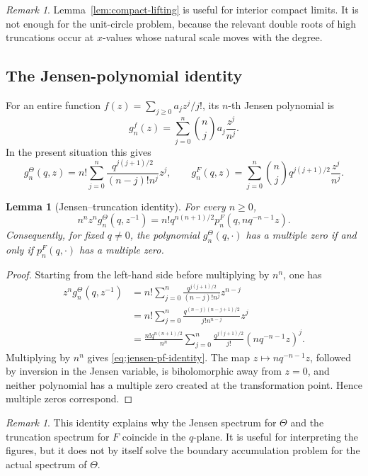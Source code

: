 \documentclass[11pt,a4paper,reqno]{amsart}
\newtheorem{lemma}[theorem]{Lemma}
\theoremstyle{remark}
\newtheorem{remark}[theorem]{Remark}
\begin{document}
\begin{remark}
Lemma~\ref{lem:compact-lifting} is useful for interior compact limits.  It is not enough for the unit-circle problem, because the relevant double roots of high truncations occur at \(x\)-values whose natural scale moves with the degree.
\end{remark}

\subsection{The Jensen-polynomial identity}
For an entire function \(f(z)=\sum_{j\ge0}a_jz^j/j!\), its \(n\)-th Jensen polynomial is
\[
        g^f_n(z)=\sum_{j=0}^n\binom nj a_j\frac{z^j}{n^j}.
\]
In the present situation this gives
\[
        g^\Theta_n(q,z)=n!\sum_{j=0}^n\frac{q^{j(j+1)/2}}{(n-j)!n^j}z^j,
        \qquad
        g^F_n(q,z)=\sum_{j=0}^n\binom nj q^{j(j+1)/2}\frac{z^j}{n^j}.
\]

\begin{lemma}[Jensen--truncation identity]\label{lem:jensen-identity}
For every \(n\ge0\),
\begin{equation}\label{eq:jensen-pf-identity}
        n^n z^n g^\Theta_n(q,z^{-1})
        =n!q^{n(n+1)/2}p^F_n(q,nq^{-n-1}z).
\end{equation}
Consequently, for fixed \(q\ne0\), the polynomial \(g^\Theta_n(q,\cdot)\) has a multiple zero if and only if \(p^F_n(q,\cdot)\) has a multiple zero.
\end{lemma}

\begin{proof}
Starting from the left-hand side before multiplying by \(n^n\), one has
\begin{align*}
 z^n g^\Theta_n(q,z^{-1})
 &=n!\sum_{j=0}^n\frac{q^{j(j+1)/2}}{(n-j)!n^j}z^{n-j}  \\
 &=n!\sum_{j=0}^n\frac{q^{(n-j)(n-j+1)/2}}{j!n^{n-j}}z^j  \\
 &=\frac{n!q^{n(n+1)/2}}{n^n}
     \sum_{j=0}^n\frac{q^{j(j+1)/2}}{j!}(nq^{-n-1}z)^j.
\end{align*}
Multiplying by \(n^n\) gives \eqref{eq:jensen-pf-identity}.  The map \(z\mapsto nq^{-n-1}z\), followed by inversion in the Jensen variable, is biholomorphic away from \(z=0\), and neither polynomial has a multiple zero created at the transformation point.  Hence multiple zeros correspond.
\end{proof}

\begin{remark}
This identity explains why the Jensen spectrum for \(\Theta\) and the truncation spectrum for \(F\) coincide in the \(q\)-plane.  It is useful for interpreting the figures, but it does not by itself solve the boundary accumulation problem for the actual spectrum of \(\Theta\).
\end{remark}
\end{document}

